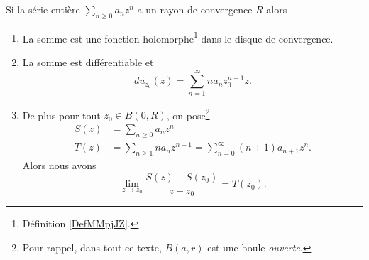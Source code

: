 \begin{proposition}     \label{PropSNMEooVgNqBP}
	Si la série entière \( \sum_{n\geq 0}a_nz^n\) a un rayon de convergence \( R\) alors
	\begin{enumerate}
		\item
		      La somme est une fonction holomorphe\footnote{Définition \ref{DefMMpjJZ}.} dans le disque de convergence.
		\item       \label{ItemUULDooEGRNiA}
		      La somme est différentiable et
		      \begin{equation}
			      du_{z_0}(z)=\sum_{n=1}^{\infty}na_nz_0^{n-1}z.
		      \end{equation}
		\item
		      De plus pour tout \( z_0\in B(0,R)\), on pose\footnote{Pour rappel, dans tout ce texte, \( B(a,r)\) est une boule \emph{ouverte}.}
		      \begin{subequations}
			      \begin{align}
				      S(z) & =\sum_{n\geq 0}a_nz^n                                          \\
				      T(z) & =\sum_{n\geq 1}na_nz^{n-1}=\sum_{n=0}^{\infty}(n+1)a_{n+1}z^n.
			      \end{align}
		      \end{subequations}
		      Alors  nous avons
		      \begin{equation}    \label{EqVQDPooOPICwN}
			      \lim_{z\to z_0}\frac{ S(z)-S(z_0) }{ z-z_0 }=T(z_0).
		      \end{equation}
	\end{enumerate}
\end{proposition}

